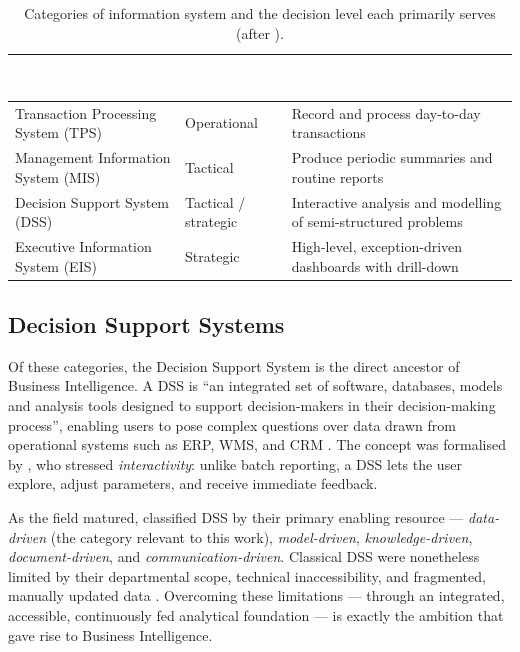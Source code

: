 \begin{table}[H]
\centering
\caption{Categories of information system and the decision level each primarily serves
(after \textcite{laudon2022}).}
\label{tab:ch1-is-types}
\renewcommand{\arraystretch}{1.35}
\begin{tabularx}{\linewidth}{|>{\raggedright\arraybackslash}p{4.2cm}|>{\raggedright\arraybackslash}p{3cm}|>{\raggedright\arraybackslash}X|}
\hline
\rowcolor{tblheader}
\textcolor{white}{\textbf{Information system}} &
\textcolor{white}{\textbf{Decision level}} &
\textcolor{white}{\textbf{Primary purpose}} \\
\hline
Transaction Processing System (TPS) & Operational          & Record and process day-to-day transactions \\
Management Information System (MIS) & Tactical             & Produce periodic summaries and routine reports \\
Decision Support System (DSS)       & Tactical / strategic & Interactive analysis and modelling of semi-structured problems \\
Executive Information System (EIS)  & Strategic            & High-level, exception-driven dashboards with drill-down \\
\hline
\end{tabularx}
\end{table}

\subsection{Decision Support Systems}

Of these categories, the Decision Support System is the direct ancestor of Business Intelligence. A DSS
is ``an integrated set of software, databases, models and analysis tools designed to support
decision-makers in their decision-making process'', enabling users to pose complex questions over data
drawn from operational systems such as ERP, WMS, and CRM \parencite{abbas2024bi}. The concept was
formalised by \textcite{keen1978}, who stressed \emph{interactivity}: unlike batch reporting, a DSS
lets the user explore, adjust parameters, and receive immediate feedback.

As the field matured, \textcite{power2002} classified DSS by their primary enabling resource ---
\emph{data-driven} (the category relevant to this work), \emph{model-driven}, \emph{knowledge-driven},
\emph{document-driven}, and \emph{communication-driven}. Classical DSS were nonetheless limited by
their departmental scope, technical inaccessibility, and fragmented, manually updated data
\parencite{sharda2020}. Overcoming these limitations --- through an integrated, accessible,
continuously fed analytical foundation --- is exactly the ambition that gave rise to Business
Intelligence.

